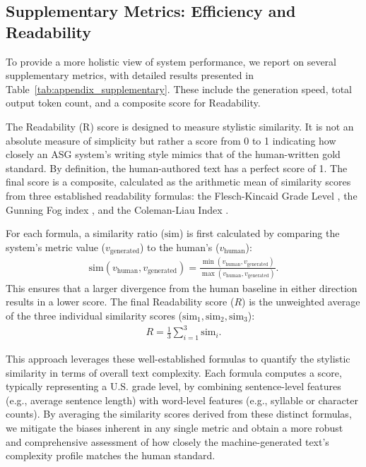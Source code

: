 \documentclass[11pt]{article}
\begin{document}
\subsection{Supplementary Metrics: Efficiency and Readability}

To provide a more holistic view of system performance, we report on several supplementary metrics, with detailed results presented in Table~\ref{tab:appendix_supplementary}. These include the generation speed, total output token count, and a composite score for Readability.

The Readability (R) score is designed to measure stylistic similarity. It is not an absolute measure of simplicity but rather a score from 0 to 1 indicating how closely an ASG system's writing style mimics that of the human-written gold standard. By definition, the human-authored text has a perfect score of 1. The final score is a composite, calculated as the arithmetic mean of similarity scores from three established readability formulas: the Flesch-Kincaid Grade Level \cite{kincaid1975derivation}, the Gunning Fog index \citep{Gunning1952}, and the Coleman-Liau Index \citep{coleman1975computer}.

For each formula, a similarity ratio ($\text{sim}$) is first calculated by comparing the system's metric value ($v_{\text{generated}}$) to the human's ($v_{\text{human}}$):
\begin{align}
\text{sim}(v_{\text{human}}, v_{\text{generated}}) = \frac{\min(v_{\text{human}}, v_{\text{generated}})}{\max(v_{\text{human}}, v_{\text{generated}})}. \nonumber
\end{align}
This ensures that a larger divergence from the human baseline in either direction results in a lower score. The final Readability score ($R$) is the unweighted average of the three individual similarity scores ($\text{sim}_1, \text{sim}_2, \text{sim}_3$):
\begin{align}
R = \frac{1}{3} \sum_{i=1}^{3} \text{sim}_i.
\end{align}

This approach leverages these well-established formulas to quantify the stylistic similarity in terms of overall text complexity. Each formula computes a score, typically representing a U.S. grade level, by combining sentence-level features (e.g., average sentence length) with word-level features (e.g., syllable or character counts). By averaging the similarity scores derived from these distinct formulas, we mitigate the biases inherent in any single metric and obtain a more robust and comprehensive assessment of how closely the machine-generated text's complexity profile matches the human standard.
\end{document}
